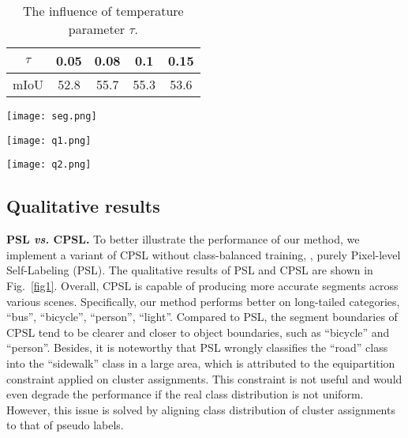 \documentclass[10pt,twocolumn,letterpaper]{article}
\begin{document}
	
	\begin{table}[!h]
		\centering
		\begin{tabular}{ccccc}
			\hline
			$\tau$ &0.05 & 0.08 & 0.1  & 0.15 \\ \hline
			mIoU   & 52.8 & 55.7 & 55.3 & 53.6 \\ \hline
		\end{tabular}
		\caption{The influence of temperature parameter $\tau$.}
		\label{tab3}\vspace{-1.0em}
	\end{table}
	
	\begin{figure*}
		\hspace{-1.5em} \vspace{-2.0em}
		\centering 
		\texttt{[image: seg.png]}\\
		\caption{Qualitative results of PSL and CPSL on the GTA5$\to$Cityscapes task.}
		\label{fig1}\vspace{-2.0em}
	\end{figure*}
	
	\begin{figure*}[!t]
		\centering 
		\texttt{[image: q1.png]}\\ \vspace{-2.5em}
		\caption{Qualitative comparison of different methods on the GTA5$\to$Cityscapes task.}
		\label{q1}\vspace{-1.5em}
	\end{figure*}
	\begin{figure*}[!t]
	\centering 
	\texttt{[image: q2.png]}\\
	\vspace{-2.5em}
	\caption{Qualitative comparison of different methods on the GTA5$\to$Cityscapes task.}
	\label{q2}
\end{figure*}
	\subsection{Qualitative results}
	\textbf{PSL \textit{vs.} CPSL.} To better illustrate the performance of our method, we implement a variant of CPSL without class-balanced training, \ie, purely Pixel-level Self-Labeling (PSL). The qualitative results of PSL and CPSL are shown in Fig.~\ref{fig1}. Overall, CPSL is capable of producing more accurate segments across various scenes. Specifically, our method performs better on long-tailed categories, \eg “bus”, “bicycle”, “person”, “light”. Compared to PSL, the segment boundaries of CPSL tend to be clearer and closer to object boundaries, such as “bicycle” and “person”. Besides, it is noteworthy that PSL wrongly classifies the “road” class into the “sidewalk” class in a large area, which is attributed to the equipartition constraint applied on cluster assignments. This constraint is not useful and would even degrade the performance if the real class distribution is not uniform. However, this issue is solved by aligning class distribution of cluster assignments to that of pseudo labels. 
\end{document}
